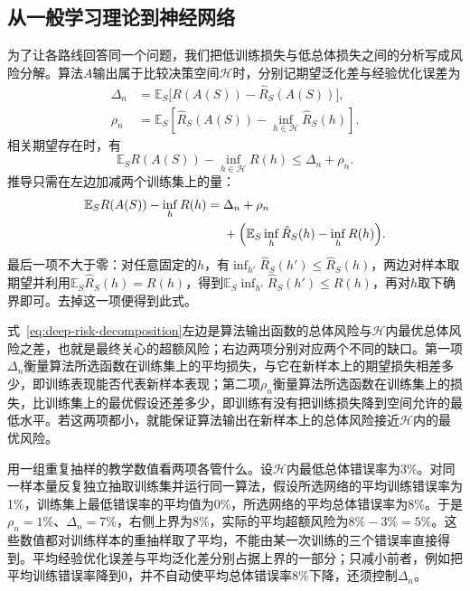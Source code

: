 \subsection{从一般学习理论到神经网络}
\label{sec:deep-general-learning}

为了让各路线回答同一个问题，我们把低训练损失与低总体损失之间的分析写成风险分解。算法$A$输出属于比较决策空间$\mathcal H$时，分别记期望泛化差与经验优化误差为
\[
 \begin{aligned}
 \Delta_n&=\mathbb E_S\bigl[R(A(S))-\hat R_S(A(S))\bigr],\\
 \rho_n&=\mathbb E_S\left[\hat R_S(A(S))-
                         \inf_{h\in\mathcal H}\hat R_S(h)\right].
 \end{aligned}
\]
相关期望存在时，有
\begin{equation}
 \mathbb E_S R(A(S))-\inf_{h\in\mathcal H}R(h)
 \leq\Delta_n+\rho_n.
 \label{eq:deep-risk-decomposition}
\end{equation}
推导只需在左边加减两个训练集上的量：
\[
 \begin{aligned}
 \mathbb E_S R(A(S))-\inf_{h}R(h)
 ={}&\Delta_n+\rho_n\\
 &+\Bigl(\mathbb E_S\inf_{h}\hat R_S(h)-\inf_{h}R(h)\Bigr).
 \end{aligned}
\]
最后一项不大于零：对任意固定的$h$，有$\inf_{h'}\hat R_S(h')\leq\hat R_S(h)$，两边对样本取期望并利用$\mathbb E_S\hat R_S(h)=R(h)$，得到$\mathbb E_S\inf_{h'}\hat R_S(h')\leq R(h)$，再对$h$取下确界即可。去掉这一项便得到此式。

式~\eqref{eq:deep-risk-decomposition}左边是算法输出函数的总体风险与$\mathcal H$内最优总体风险之差，也就是最终关心的超额风险；右边两项分别对应两个不同的缺口。第一项$\Delta_n$衡量算法所选函数在训练集上的平均损失，与它在新样本上的期望损失相差多少，即训练表现能否代表新样本表现；第二项$\rho_n$衡量算法所选函数在训练集上的损失，比训练集上的最优假设还差多少，即训练有没有把训练损失降到空间允许的最低水平。若这两项都小，就能保证算法输出在新样本上的总体风险接近$\mathcal H$内的最优风险。

用一组重复抽样的教学数值看两项各管什么。设$\mathcal H$内最低总体错误率为3\%。对同一样本量反复独立抽取训练集并运行同一算法，假设所选网络的平均训练错误率为1\%，训练集上最低错误率的平均值为0\%，所选网络的平均总体错误率为8\%。于是$\rho_n=1\%$、$\Delta_n=7\%$，右侧上界为8\%，实际的平均超额风险为$8\%-3\%=5\%$。这些数值都对训练样本的重抽样取了平均，不能由某一次训练的三个错误率直接得到。平均经验优化误差与平均泛化差分别占据上界的一部分；只减小前者，例如把平均训练错误率降到0，并不自动使平均总体错误率8\%下降，还须控制$\Delta_n$。

